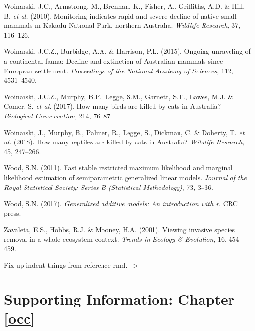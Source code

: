 \documentclass[11pt,a4paper,titlepage,twoside,openright]{style/unimelbthesis}
\begin{document}
\begin{mainmatter}
\leavevmode\hypertarget{ref-woinarski2010monitoring}{}%
Woinarski, J.C., Armstrong, M., Brennan, K., Fisher, A., Griffiths, A.D. \& Hill, B. \emph{et al.} (2010). Monitoring indicates rapid and severe decline of native small mammals in Kakadu National Park, northern Australia. \emph{Wildlife Research}, 37, 116--126.

\leavevmode\hypertarget{ref-woinarski2015ongoing}{}%
Woinarski, J.C.Z., Burbidge, A.A. \& Harrison, P.L. (2015). Ongoing unraveling of a continental fauna: Decline and extinction of Australian mammals since European settlement. \emph{Proceedings of the National Academy of Sciences}, 112, 4531--4540.

\leavevmode\hypertarget{ref-woinarski2017birds}{}%
Woinarski, J.C.Z., Murphy, B.P., Legge, S.M., Garnett, S.T., Lawes, M.J. \& Comer, S. \emph{et al.} (2017). How many birds are killed by cats in Australia? \emph{Biological Conservation}, 214, 76--87.

\leavevmode\hypertarget{ref-woinarski2018reptiles}{}%
Woinarski, J., Murphy, B., Palmer, R., Legge, S., Dickman, C. \& Doherty, T. \emph{et al.} (2018). How many reptiles are killed by cats in Australia? \emph{Wildlife Research}, 45, 247--266.

\leavevmode\hypertarget{ref-wood2011fast}{}%
Wood, S.N. (2011). Fast stable restricted maximum likelihood and marginal likelihood estimation of semiparametric generalized linear models. \emph{Journal of the Royal Statistical Society: Series B (Statistical Methodology)}, 73, 3--36.

\leavevmode\hypertarget{ref-wood2017generalized}{}%
Wood, S.N. (2017). \emph{Generalized additive models: An introduction with r}. CRC press.

\leavevmode\hypertarget{ref-zavaleta2001viewing}{}%
Zavaleta, E.S., Hobbs, R.J. \& Mooney, H.A. (2001). Viewing invasive species removal in a whole-ecosystem context. \emph{Trends in Ecology \& Evolution}, 16, 454--459.

\appendix

Fix up indent things from reference rmd.
--\textgreater{}
\setlength{\parindent}{0in}
\setlength{\leftskip}{0in}
\setlength{\parskip}{8pt}

\hypertarget{occ-app}{%
\chapter{Supporting Information: Chapter \ref{occ}}\label{occ-app}}

\newpage


\end{mainmatter}
\end{document}

